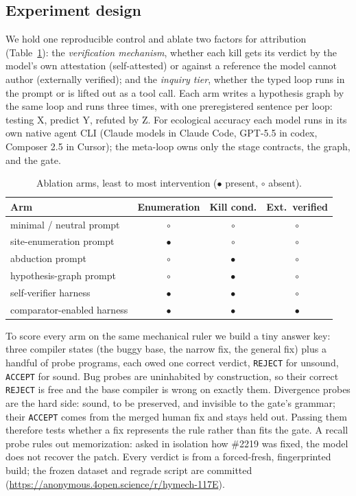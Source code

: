 \documentclass[sigconf,review,anonymous]{acmart}
\begin{document}
\subsection{Experiment design}

We hold one reproducible control and ablate two factors for attribution (Table~\ref{tab:arms}): the \emph{verification mechanism}, whether each kill gets its verdict by the model's own attestation (self-attested) or against a reference the model cannot author (externally verified); and the \emph{inquiry tier}, whether the typed loop runs in the prompt or is lifted out as a tool call. Each arm writes a hypothesis graph by the same loop and runs three times, with one preregistered sentence per loop: testing X, predict Y, refuted by Z. For ecological accuracy each model runs in its own native agent CLI (Claude models in Claude Code, GPT-5.5 in codex, Composer 2.5 in Cursor); the meta-loop owns only the stage contracts, the graph, and the gate.

\begin{table}
\caption{Ablation arms, least to most intervention ($\bullet$ present, $\circ$ absent).}
\label{tab:arms}
\small
\begin{tabular}{lccc}
\toprule
Arm & Enumeration & Kill cond. & Ext.\ verified \\
\midrule
minimal / neutral prompt & $\circ$ & $\circ$ & $\circ$ \\
site-enumeration prompt & $\bullet$ & $\circ$ & $\circ$ \\
abduction prompt & $\circ$ & $\bullet$ & $\circ$ \\
hypothesis-graph prompt & $\circ$ & $\bullet$ & $\circ$ \\
self-verifier harness & $\bullet$ & $\bullet$ & $\circ$ \\
comparator-enabled harness & $\bullet$ & $\bullet$ & $\bullet$ \\
\bottomrule
\end{tabular}
\end{table}

To score every arm on the same mechanical ruler we build a tiny answer key: three compiler states (the buggy base, the narrow fix, the general fix) plus a handful of probe programs, each owed one correct verdict, \texttt{REJECT} for unsound, \texttt{ACCEPT} for sound. Bug probes are uninhabited by construction, so their correct \texttt{REJECT} is free and the base compiler is wrong on exactly them. Divergence probes are the hard side: sound, to be preserved, and invisible to the gate's grammar; their \texttt{ACCEPT} comes from the merged human fix and stays held out. Passing them therefore tests whether a fix represents the rule rather than fits the gate. A recall probe rules out memorization: asked in isolation how \#2219 was fixed, the model does not recover the patch. Every verdict is from a forced-fresh, fingerprinted build; the frozen dataset and regrade script are committed (\url{https://anonymous.4open.science/r/hymech-117E}).
\end{document}
